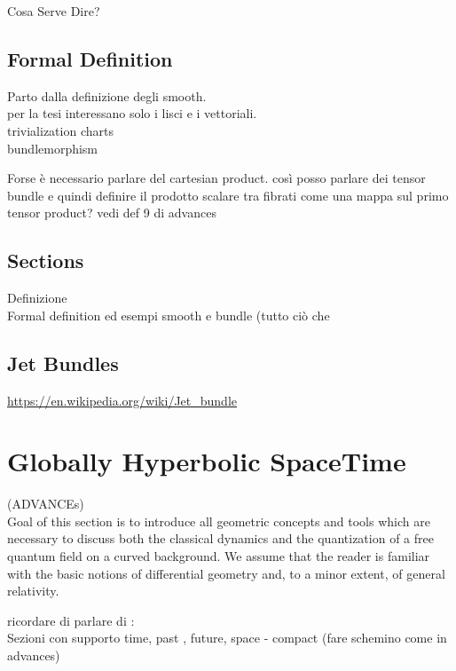 \documentclass[Main]{subfiles}
\begin{document}
	
	
		Cosa Serve Dire?
			\subsection{Formal Definition}
			Parto dalla definizione degli smooth.\\
			per la tesi interessano solo i lisci e i vettoriali.\\
			trivialization charts\\
			bundlemorphism\\
			\begin{Warning}
				Forse è necessario parlare del cartesian product. così posso parlare dei tensor bundle e quindi definire il prodotto scalare tra fibrati come una mappa sul primo tensor product?
				vedi def 9 di advances
				
			\end{Warning}			
			
			\subsection{Sections}
			Definizione\\
			
Formal definition ed esempi smooth e bundle (tutto ciò che 

			\subsection{Jet Bundles}
				\url{https://en.wikipedia.org/wiki/Jet_bundle}
				


	\section{Globally Hyperbolic SpaceTime}
		\begin{Warning}
		(ADVANCEs)\\
		Goal of this section is to introduce all geometric concepts and tools which are necessary to discuss both the classical dynamics and the quantization of a free quantum field on a curved background. We assume that the reader is familiar with the basic notions of differential geometry and, to a minor extent, of general relativity.
		\end{Warning}
			
		ricordare di parlare di :
		\\ Sezioni con supporto time, past , future, space - compact (fare schemino come in advances)
\end{document}
